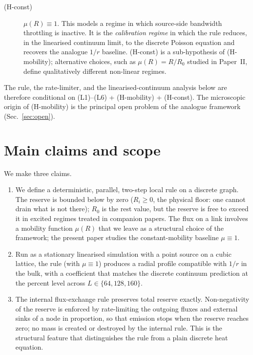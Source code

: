 \documentclass[11pt,a4paper]{article}
\begin{document}
\begin{description}
\item[(H-const)] $\mu(R) \equiv 1$. This models a regime in
which source-side bandwidth throttling is inactive. It is the
\emph{calibration regime} in which the rule reduces, in the
linearised continuum limit, to the discrete Poisson equation
and recovers the analogue $1/r$ baseline. (H-const) is a
sub-hypothesis of (H-mobility); alternative choices, such as
$\mu(R) = R/R_0$ studied in Paper~II, define qualitatively
different non-linear regimes.
\end{description}

The rule, the rate-limiter, and the linearised-continuum
analysis below are therefore conditional on (L1)--(L6) +
(H-mobility) + (H-const). The microscopic origin of (H-mobility)
is the principal open problem of the analogue framework
(Sec.~\ref{sec:open}).

\section{Main claims and scope}
\label{sec:claims}

We make three claims.

\begin{enumerate}
\item We define a deterministic, parallel, two-step local rule
on a discrete graph. The reserve is bounded below by zero
($R_i \ge 0$, the physical floor: one cannot drain what is not
there); $R_0$ is the rest value, but the reserve is free to
exceed it in excited regimes treated in companion papers. The
flux on a link involves a mobility function $\mu(R)$ that we
leave as a structural choice of the framework; the present
paper studies the constant-mobility baseline $\mu \equiv 1$.
\item Run as a stationary linearised simulation with a point
source on a cubic lattice, the rule (with $\mu \equiv 1$)
produces a radial profile compatible with $1/r$ in the bulk,
with a coefficient that matches the discrete continuum
prediction at the percent level across $L \in \{64, 128, 160\}$.
\item The internal flux-exchange rule preserves total reserve
exactly. Non-negativity of the reserve is enforced by
rate-limiting the outgoing fluxes and external sinks of a node
in proportion, so that emission stops when the reserve reaches
zero; no mass is created or destroyed by the internal rule.
This is the structural feature that distinguishes the rule
from a plain discrete heat equation.
\end{enumerate}
\end{document}
